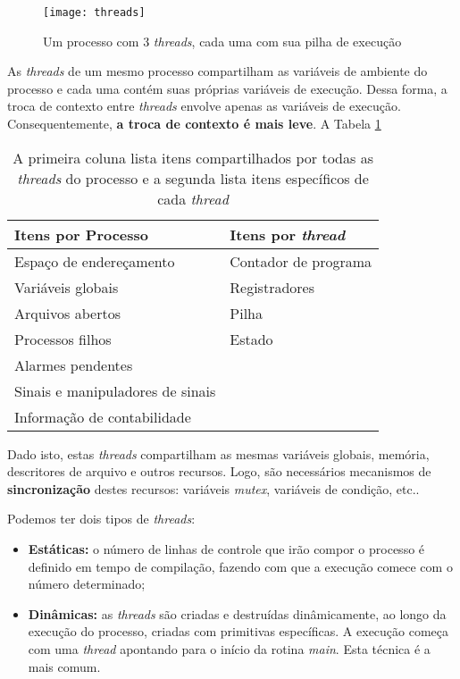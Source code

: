 \begin{figure}[h]
  \centering
  \texttt{[image: threads]}
  \caption{Um processo com 3 \textit{threads}, cada uma com sua pilha de execução}
  \label{fig:threads}
\end{figure}

As \textit{threads} de um mesmo processo compartilham as variáveis de ambiente do processo e cada uma contém suas próprias variáveis de execução. Dessa forma, a troca de contexto entre \textit{threads} envolve apenas as variáveis de execução. Consequentemente, \textbf{a troca de contexto é mais leve}. A Tabela \ref{tab:process-thread-data}

\begin{table}[h]
  \centering
  \begin{tabular}{l|l}
    \textbf{Itens por Processo} & \textbf{Itens por \textit{thread}} \\
    \hline
    Espaço de endereçamento & Contador de programa \\
    Variáveis globais & Registradores \\
    Arquivos abertos & Pilha \\
    Processos filhos & Estado \\
    Alarmes pendentes & \\
    Sinais e manipuladores de sinais & \\
    Informação de contabilidade & \\
    \hline
  \end{tabular}

  \caption{A primeira coluna lista itens compartilhados por todas as \textit{threads} do processo e a segunda lista itens específicos de cada \textit{thread}}
  \label{tab:process-thread-data}
\end{table}

Dado isto, estas \textit{threads} compartilham as mesmas variáveis globais, memória, descritores de arquivo e outros recursos. Logo, são necessários mecanismos de \textbf{sincronização} destes recursos: variáveis \textit{mutex}, variáveis de condição, etc..

Podemos ter dois tipos de \textit{threads}:
\begin{itemize}
  \item \textbf{Estáticas:} o número de linhas de controle que irão compor o processo é definido em tempo de compilação, fazendo com que a execução comece com o número determinado;

  \item \textbf{Dinâmicas:} as \textit{threads} são criadas e destruídas dinâmicamente, ao longo da execução do processo, criadas com primitivas específicas. A execução começa com uma \textit{thread} apontando para o início da rotina \textit{main}. Esta técnica é a mais comum.
\end{itemize}






